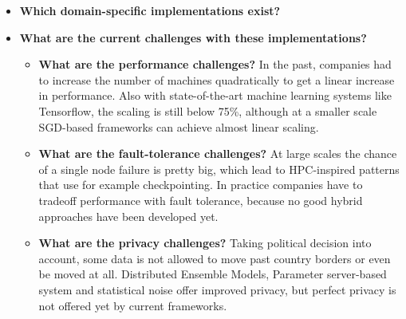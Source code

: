 \begin{itemize}
	\begin{itemize}
		\item \textbf{Which domain-specific implementations exist?}
		\item \textbf{What are the current challenges with these implementations?}
		\begin{itemize}
			\item \textbf{What are the performance challenges?} In the past, companies had to increase the number of machines quadratically to get a linear increase in performance. Also with state-of-the-art machine learning systems like Tensorflow, the scaling is still below 75\%, although at a smaller scale SGD-based frameworks can achieve almost linear scaling.
			\item \textbf{What are the fault-tolerance challenges?} At large scales the chance of a single node failure is pretty big, which lead to HPC-inspired patterns that use for example checkpointing. In practice companies have to tradeoff performance with fault tolerance, because no good hybrid approaches have been developed yet.
			\item \textbf{What are the privacy challenges?} Taking political decision into account, some data is not allowed to move past country borders or even be moved at all. Distributed Ensemble Models, Parameter server-based system and statistical noise offer improved privacy, but perfect privacy is not offered yet by current frameworks.
		\end{itemize}
	\end{itemize}
\end{itemize}
